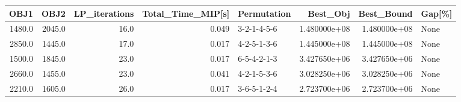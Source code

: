 \begin{tabular}{rrrrlrrl}
\toprule
   OBJ1 &    OBJ2 &  LP\_iterations &  Total\_Time\_MIP[s] &  Permutation &      Best\_Obj &    Best\_Bound & Gap[\%] \\
\midrule
 1480.0 &  2045.0 &           16.0 &              0.049 &  3-2-1-4-5-6 &  1.480000e+08 &  1.480000e+08 &   None \\
 2850.0 &  1445.0 &           17.0 &              0.017 &  4-2-5-1-3-6 &  1.445000e+08 &  1.445000e+08 &   None \\
 1500.0 &  1845.0 &           23.0 &              0.017 &  6-5-4-2-1-3 &  3.427650e+06 &  3.427650e+06 &   None \\
 2660.0 &  1455.0 &           23.0 &              0.041 &  4-2-1-5-3-6 &  3.028250e+06 &  3.028250e+06 &   None \\
 2210.0 &  1605.0 &           26.0 &              0.017 &  3-6-5-1-2-4 &  2.723700e+06 &  2.723700e+06 &   None \\
\bottomrule
\end{tabular}
